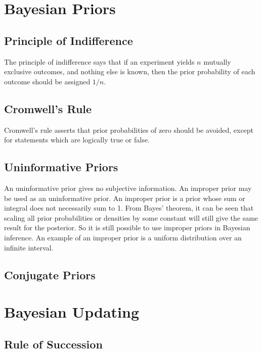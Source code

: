 \documentclass[11pt]{report} %
\begin{document}
\section{Bayesian Priors}

\subsection{Principle of Indifference}

The principle of indifference says that if an experiment yields $n$ mutually exclusive outcomes, and nothing else is known, then the prior probability of each outcome should be assigned $1/n$.

\subsection{Cromwell's Rule}

Cromwell's rule asserts that prior probabilities of zero should be avoided, except for statements which are logically true or false.

\subsection{Uninformative Priors}

An uninformative prior gives no subjective information. An improper prior may be used as an uninformative prior. An improper prior is a prior whose sum or integral does not necessarily sum to 1. From Bayes' theorem, it can be seen that scaling all prior probabilities or densities by some constant will still give the same result for the posterior. So it is still possible to use improper priors in Bayesian inference. An example of an improper prior is a uniform distribution over an infinite interval.

\subsection{Conjugate Priors}

\section{Bayesian Updating}

\subsection{Rule of Succession}
\end{document}
